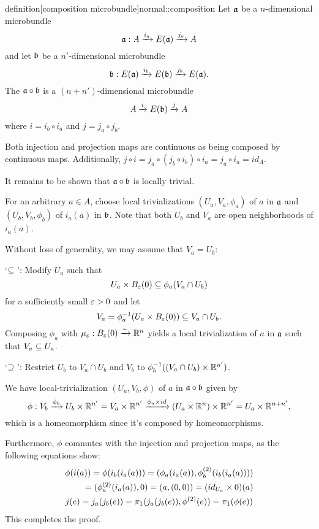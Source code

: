 \begin{mystatement}{definition}[composition microbundle]{normal::composition}
    Let $\ba$ be a $n$-dimensional microbundle
    \[ \bundledef{\ba}{A}{E(\ba)}{i_a}{j_a} \]
    and let $\bb$ be a $n'$-dimensional microbundle
    \[ \bundledef{\bb}{E(\ba)}{E(\bb)}{i_b}{j_b}. \]
    The  $\ba \circ \bb$ is a $(n + n')$-dimensional microbundle
    \[ \bundle{A}{E(\bb)}{i}{j} \]
    where $i = i_b \circ i_a$ and $j = j_a \circ j_b$.
\end{mystatement}

\begin{myproof}
    Both injection and projection maps are continuous as being composed by continuous maps.
    Additionally, $j \circ i = j_a \circ (j_b \circ i_b) \circ i_a = j_a \circ i_a = id_A$.

    It remains to be shown that $\ba \circ \bb$ is locally trivial.

    For an arbitrary $a \in A$, choose local trivializations
    $(U_a, V_a, \phi_a)$ of $a$ in $\ba$ and $(U_b, V_b, \phi_b)$ of $i_a(a)$ in $\bb$.
    Note that both $U_b$ and $V_a$ are open neighborhoods of $i_a(a)$.
    
    Without loss of generality, we may assume that $V_a = U_b$:
    
    `$\sub$':
    Modify $U_a$ such that
    \[ U_a \cross \ball[\eps] \sub \phi_a(V_a \cap U_b) \]
    for a sufficiently small $\eps > 0$ and let
    \[ V_a = \inv{\phi_a}(U_a \cross \ball[\eps]) \sub V_a \cap U_b. \]
    Composing $\phi_a$ with $\mu_\eps: \ball[\eps] \isomto \R^n$
    yields a local trivialization of $a$ in $\ba$ such that $V_a \sub U_a$.

    `$\bus$': Restrict $U_b$ to $V_a \cap U_b$ and $V_b$ to $\inv{\phi_b}((V_a \cap U_b) \cross \R^{n'})$.

    We have local-trivialization $(U_a, V_b, \phi)$ of $a$ in $\ba \circ \bb$ given by
    \[ 
        \phi: V_b \xto{\phi_b} U_b \cross \R^{n'}
        = V_a \cross \R^{n'}
        \xto{\phi_a \cross id} (U_a \cross \R^{n}) \cross \R^{n'}
        = U_a \cross \R^{n + n'},
    \]
    which is a homeomorphism since it's composed by homeomorphisms.

    Furthermore, $\phi$ commutes with the injection and projection maps,
    as the following equations show:
    \begin{gather}
        \begin{split}
            \phi(i(a)) = \phi(i_b(i_a(a))) = (\phi_a(i_a(a)), \snd{\phi_b}(i_b(i_a(a)))) \\
            = (\snd{\phi_a}(i_a(a)), 0) = (a, (0, 0)) = (id_{U_a} \cross 0)(a)    
        \end{split} \\
        j(e) = j_a(j_b(e)) = \pi_1(j_a(j_b(e)), \snd{\phi}(e)) = \pi_1(\phi(e))
    \end{gather}
    This completes the proof.
\end{myproof}
